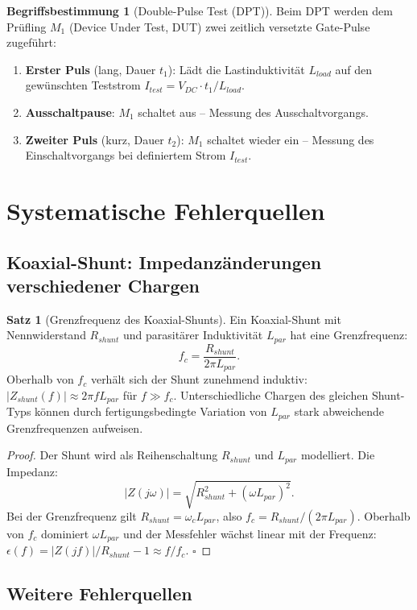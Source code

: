 ﻿\documentclass[a4paper,12pt,openany,oneside]{book}
\newcommand{\abschnitt}[1]{\section{#1}}
\newcommand{\unterabschnitt}[1]{\subsection{#1}}
\theoremstyle{definition}
\newtheorem{definition}{Begriffsbestimmung}[chapter]
\newtheorem{satz}{Satz}[chapter]
\begin{document}
\begin{definition}[Double-Pulse Test (DPT)]
  Beim DPT werden dem Pr\"ufling $M_1$ (Device Under Test, DUT) zwei zeitlich versetzte
  Gate-Pulse zugef\"uhrt:
  \begin{enumerate}
    \item \textbf{Erster Puls} (lang, Dauer $t_1$): L\"adt die Lastinduktivit\"at $L_{load}$
      auf den gew\"unschten Teststrom $I_{test} = V_{DC} \cdot t_1 / L_{load}$.
    \item \textbf{Ausschaltpause}: $M_1$ schaltet aus -- Messung des Ausschaltvorgangs.
    \item \textbf{Zweiter Puls} (kurz, Dauer $t_2$): $M_1$ schaltet wieder ein --
      Messung des Einschaltvorgangs bei definiertem Strom $I_{test}$.
  \end{enumerate}
\end{definition}

\abschnitt{Systematische Fehlerquellen}

\unterabschnitt{Koaxial-Shunt: Impedanz\"anderungen verschiedener Chargen}

\begin{satz}[Grenzfrequenz des Koaxial-Shunts]
  Ein Koaxial-Shunt mit Nennwiderstand $R_{shunt}$ und parasit\"arer Induktivit\"at
  $L_{par}$ hat eine Grenz\-frequenz:
  \[
    f_c = \frac{R_{shunt}}{2\pi L_{par}}.
  \]
  Oberhalb von $f_c$ verh\"alt sich der Shunt zunehmend induktiv:
  $|Z_{shunt}(f)| \approx 2\pi f L_{par}$ f\"ur $f \gg f_c$.
  Unterschiedliche Chargen des gleichen Shunt-Typs k\"onnen durch fertigungsbedingte
  Variation von $L_{par}$ stark abweichende Grenzfrequenzen aufweisen.
\end{satz}

\begin{proof}
  Der Shunt wird als Reihenschaltung $R_{shunt}$ und $L_{par}$ modelliert.
  Die Impedanz:
  \[
    |Z(j\omega)| = \sqrt{R_{shunt}^2 + (\omega L_{par})^2}.
  \]
  Bei der Grenzfrequenz gilt $R_{shunt} = \omega_c L_{par}$, also $f_c = R_{shunt}/(2\pi L_{par})$.
  Oberhalb von $f_c$ dominiert $\omega L_{par}$ und der Messfehler w\"achst linear mit der Frequenz:
  $\epsilon(f) = |Z(jf)| / R_{shunt} - 1 \approx f/f_c$. \qquad$\square$
\end{proof}

\unterabschnitt{Weitere Fehlerquellen}
\end{document}
